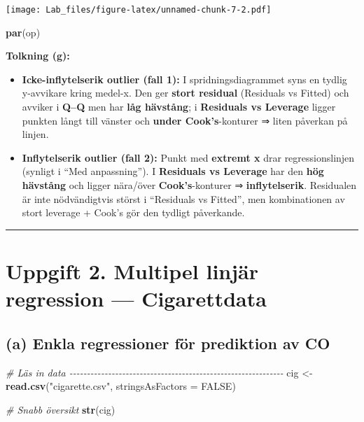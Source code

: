 \documentclass[
  11pt,
]{article}
\newenvironment{Shaded}{\begin{snugshade}}{\end{snugshade}}
\newcommand{\AttributeTok}[1]{\textcolor[rgb]{0.13,0.29,0.53}{#1}}
\newcommand{\CommentTok}[1]{\textcolor[rgb]{0.56,0.35,0.01}{\textit{#1}}}
\newcommand{\ConstantTok}[1]{\textcolor[rgb]{0.56,0.35,0.01}{#1}}
\newcommand{\FunctionTok}[1]{\textcolor[rgb]{0.13,0.29,0.53}{\textbf{#1}}}
\newcommand{\NormalTok}[1]{#1}
\newcommand{\OtherTok}[1]{\textcolor[rgb]{0.56,0.35,0.01}{#1}}
\newcommand{\StringTok}[1]{\textcolor[rgb]{0.31,0.60,0.02}{#1}}
\begin{document}
\texttt{[image: Lab\_files/figure-latex/unnamed-chunk-7-2.pdf]}

\begin{Shaded}
\begin{Highlighting}[]
\FunctionTok{par}\NormalTok{(op)}
\end{Highlighting}
\end{Shaded}

\textbf{Tolkning (g):}

\begin{itemize}
\item
  \textbf{Icke-inflytelserik outlier (fall 1):} I spridningsdiagrammet
  syns en tydlig y-avvikare kring medel-x. Den ger \textbf{stort
  residual} (Residuals vs Fitted) och avviker i \textbf{Q--Q} men har
  \textbf{låg hävstång}; i \textbf{Residuals vs Leverage} ligger punkten
  långt till vänster och \textbf{under Cook's}-konturer ⇒ liten påverkan
  på linjen.
\item
  \textbf{Inflytelserik outlier (fall 2):} Punkt med \textbf{extremt x}
  drar regressionslinjen (synligt i ``Med anpassning''). I
  \textbf{Residuals vs Leverage} har den \textbf{hög hävstång} och
  ligger nära/över \textbf{Cook's}-konturer ⇒ \textbf{inflytelserik}.
  Residualen är inte nödvändigtvis störst i ``Residuals vs Fitted'', men
  kombinationen av stort leverage + Cook's gör den tydligt påverkande.
\end{itemize}

\begin{center}\rule{0.5\linewidth}{0.5pt}\end{center}

\section{Uppgift 2. Multipel linjär regression ---
Cigarettdata}\label{uppgift-2.-multipel-linjuxe4r-regression-cigarettdata}

\subsection{(a) Enkla regressioner för prediktion av
CO}\label{a-enkla-regressioner-fuxf6r-prediktion-av-co}

\begin{Shaded}
\begin{Highlighting}[]
\CommentTok{\# Läs in data {-}{-}{-}{-}{-}{-}{-}{-}{-}{-}{-}{-}{-}{-}{-}{-}{-}{-}{-}{-}{-}{-}{-}{-}{-}{-}{-}{-}{-}{-}{-}{-}{-}{-}{-}{-}{-}{-}{-}{-}{-}{-}{-}{-}{-}{-}{-}{-}{-}{-}{-}{-}{-}{-}{-}{-}{-}{-}{-}{-}{-}}
\NormalTok{cig }\OtherTok{\textless{}{-}} \FunctionTok{read.csv}\NormalTok{(}\StringTok{"cigarette.csv"}\NormalTok{, }\AttributeTok{stringsAsFactors =} \ConstantTok{FALSE}\NormalTok{)}

\CommentTok{\# Snabb översikt}
\FunctionTok{str}\NormalTok{(cig)}
\end{Highlighting}
\end{Shaded}
\end{document}
